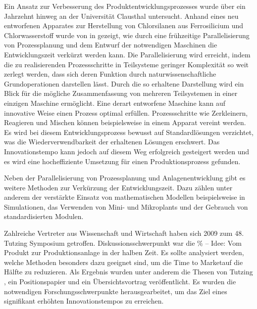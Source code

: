 Ein Ansatz zur Verbesserung des Produktentwicklungsprozesses wurde \"uber ein Jahrzehnt hinweg an der Universit\"at Clausthal untersucht. Anhand eines neu entworfenen Apparates zur Herstellung von Chlorsilanen aus Ferrosilicium und Chlorwasserstoff wurde von \citeauthor{Dietz_2000} in \cite{Dietz_2000} gezeigt, wie durch eine fr\"uhzeitige Parallelisierung von Prozessplanung und dem Entwurf der notwendigen Maschinen die Entwicklungszeit verk\"urzt werden kann. Die Parallelisierung wird erreicht, indem die zu realisierenden Prozessschritte in Teilsysteme geringer Komplexit\"at so weit zerlegt werden, dass sich deren Funktion durch naturwissenschaftliche Grundoperationen darstellen l\"asst. Durch die so erhaltene Darstellung wird ein Blick f\"ur die m\"ogliche Zusammenfassung von mehreren Teilsystemen in einer einzigen Maschine erm\"oglicht. Eine derart entworfene Maschine kann auf innovative Weise einen Prozess optimal erf\"ullen. Prozessschritte wie Zerkleinern, Reagieren und Mischen k\"onnen beispielsweise in einem Apparat vereint werden. Es wird bei diesem Entwicklungsprozess bewusst auf Standardl\"osungen verzichtet, was die Wiederverwendbarkeit der erhaltenen L\"osungen  erschwert. Das Innovationstempo kann jedoch auf diesem Weg erfolgreich gesteigert werden und es wird eine hocheffiziente Umsetzung f\"ur einen  Produktionsprozess gefunden. 

Neben der Parallelisierung von Prozessplanung und Anlagenentwicklung gibt es weitere Methoden zur Verk\"urzung der Entwicklungszeit. Dazu z\"ahlen unter anderem der verst\"arkte Einsatz von mathematischen Modellen beispielsweise in Simulationen, das Verwenden von Mini- und Mikroplants und der Gebrauch von standardisierten Modulen.

Zahlreiche Vertreter aus Wissenschaft und Wirtschaft haben sich 2009 zum 48. Tutzing Symposium getroffen. Diskussionsschwerpunkt war die \% -- Idee: Vom Produkt zur Produktionsanlage in der halben Zeit\grqq . Es sollte analysiert werden, welche Methoden besonders dazu geeignet sind, um die \glqq Time to Market\grqq { }auf die H\"alfte zu reduzieren. Als Ergebnis wurden unter anderem die Thesen von Tutzing \cite{Processnet_2009}, ein Positionspapier \cite{Processnet_2010} und ein \"Ubersichtsvortrag \cite{Schembecker_2009} ver\"offentlicht. Es wurden die notwendigen Forschungsschwerpunkte herausgearbeitet, um das Ziel eines signifikant erh\"ohten Innovationstempos zu erreichen.

